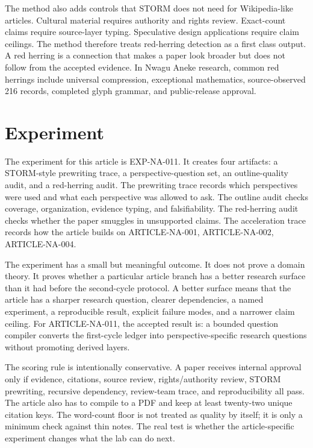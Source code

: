 \documentclass[sigconf,nonacm]{acmart}
\begin{document}
The method also adds controls that STORM does not need for Wikipedia-like
articles. Cultural material requires authority and rights review. Exact-count
claims require source-layer typing. Speculative design applications require
claim ceilings. The method therefore treats red-herring detection as a first
class output. A red herring is a connection that makes a paper look broader but
does not follow from the accepted evidence. In Nwagu Aneke research, common red
herrings include universal compression, exceptional mathematics, source-observed
216 records, completed glyph grammar, and public-release approval.

\section{Experiment}
The experiment for this article is EXP-NA-011. It creates four artifacts: a
STORM-style prewriting trace, a perspective-question set, an outline-quality
audit, and a red-herring audit. The prewriting trace records which perspectives
were used and what each perspective was allowed to ask. The outline audit checks
coverage, organization, evidence typing, and falsifiability. The red-herring
audit checks whether the paper smuggles in unsupported claims. The acceleration
trace records how the article builds on ARTICLE-NA-001, ARTICLE-NA-002, ARTICLE-NA-004.

The experiment has a small but meaningful outcome. It does not prove a domain
theory. It proves whether a particular article branch has a better research
surface than it had before the second-cycle protocol. A better surface means
that the article has a sharper research question, clearer dependencies, a named
experiment, a reproducible result, explicit failure modes, and a narrower claim
ceiling. For ARTICLE-NA-011, the accepted result is: a bounded question compiler converts the first-cycle ledger into perspective-specific research questions without promoting derived layers.

The scoring rule is intentionally conservative. A paper receives internal
approval only if evidence, citations, source review, rights/authority review,
STORM prewriting, recursive dependency, review-team trace, and reproducibility
all pass. The article also has to compile to a PDF and keep at least twenty-two
unique citation keys. The word-count floor is not treated as quality by itself;
it is only a minimum check against thin notes. The real test is whether the
article-specific experiment changes what the lab can do next.
\end{document}
